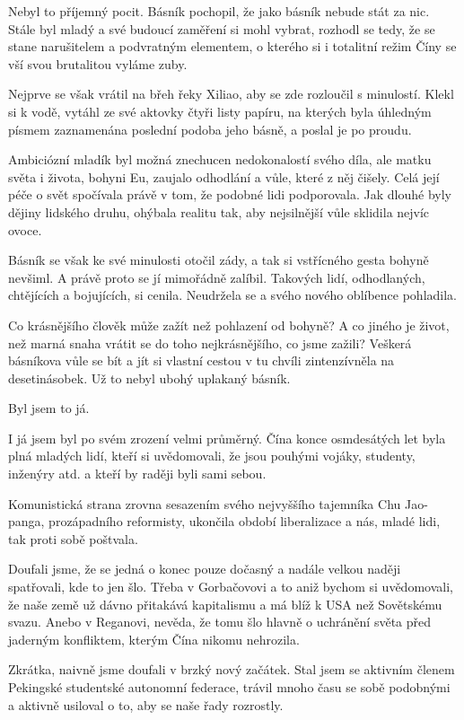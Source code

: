 Nebyl to příjemný pocit. Básník pochopil, že jako básník nebude stát za nic. Stále byl mladý a své budoucí zaměření si mohl vybrat, rozhodl se tedy, že se stane narušitelem a podvratným elementem, o kterého si i totalitní režim Číny se vší svou brutalitou vyláme zuby.

Nejprve se však vrátil na břeh řeky Xiliao, aby se zde rozloučil s minulostí. Klekl si k vodě, vytáhl ze své aktovky čtyři listy papíru, na kterých byla úhledným písmem zaznamenána poslední podoba jeho básně, a poslal je po proudu.

Ambiciózní mladík byl možná znechucen nedokonalostí svého díla, ale matku světa i života, bohyni Eu, zaujalo odhodlání a vůle, které z něj čišely. Celá její péče o svět spočívala právě v tom, že podobné lidi podporovala. Jak dlouhé byly dějiny lidského druhu, ohýbala realitu tak, aby nejsilnější vůle sklidila nejvíc ovoce.

Básník se však ke své minulosti otočil zády, a tak si vstřícného gesta bohyně nevšiml. A právě proto se jí mimořádně zalíbil. Takových lidí, odhodlaných, chtějících a bojujících, si cenila. Neudržela se a svého nového oblíbence pohladila.

Co krásnějšího člověk může zažít než pohlazení od bohyně? A co jiného je život, než marná snaha vrátit se do toho nejkrásnějšího, co jsme zažili? Veškerá básníkova vůle se bít a jít si vlastní cestou v tu chvíli zintenzívněla na desetinásobek. Už to nebyl ubohý uplakaný básník.

 Byl jsem to já.

\vspace{0.75cm}

 I já jsem byl po svém zrození velmi průměrný. Čína konce osmdesátých let byla plná mladých lidí, kteří si uvědomovali, že jsou pouhými vojáky, studenty, inženýry atd. a kteří by raději byli sami sebou.

Komunistická strana zrovna sesazením svého nejvyššího tajemníka Chu Jao-panga, prozápadního reformisty, ukončila období liberalizace a nás, mladé lidi, tak proti sobě poštvala.

Doufali jsme, že se jedná o konec pouze dočasný a nadále velkou naději spatřovali, kde to jen šlo.  Třeba v Gorbačovovi a to aniž bychom si uvědomovali, že naše země už dávno přitakává kapitalismu a má blíž k USA než Sovětskému svazu.  Anebo v Reganovi, nevěda, že tomu šlo hlavně o uchránění světa před jaderným konfliktem, kterým Čína nikomu nehrozila.
	
 Zkrátka, naivně jsme doufali v brzký nový začátek.
Stal jsem se aktivním členem Pekingské studentské autonomní federace, trávil mnoho času se sobě podobnými a aktivně usiloval o to, aby se naše řady rozrostly.

